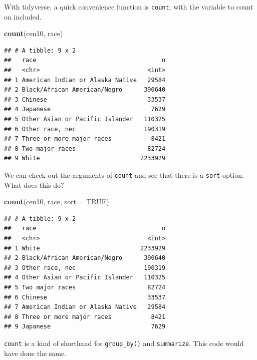 \documentclass[]{book}
\newenvironment{Shaded}{\begin{snugshade}}{\end{snugshade}}
\newcommand{\DataTypeTok}[1]{\textcolor[rgb]{0.13,0.29,0.53}{#1}}
\newcommand{\KeywordTok}[1]{\textcolor[rgb]{0.13,0.29,0.53}{\textbf{#1}}}
\newcommand{\NormalTok}[1]{#1}
\newcommand{\OperatorTok}[1]{\textcolor[rgb]{0.81,0.36,0.00}{\textbf{#1}}}
\newcommand{\OtherTok}[1]{\textcolor[rgb]{0.56,0.35,0.01}{#1}}
\newcommand{\StringTok}[1]{\textcolor[rgb]{0.31,0.60,0.02}{#1}}
\theoremstyle{definition}
\theoremstyle{definition}
\theoremstyle{definition}
\theoremstyle{remark}
\begin{document}
With tidyverse, a quick convenience function is \texttt{count}, with the variable to count on included.

\begin{Shaded}
\begin{Highlighting}[]
\KeywordTok{count}\NormalTok{(cen10, race)}
\end{Highlighting}
\end{Shaded}

\begin{verbatim}
## # A tibble: 9 x 2
##   race                                   n
##   <chr>                              <int>
## 1 American Indian or Alaska Native   29584
## 2 Black/African American/Negro      390640
## 3 Chinese                            33537
## 4 Japanese                            7629
## 5 Other Asian or Pacific Islander   110325
## 6 Other race, nec                   190319
## 7 Three or more major races           8421
## 8 Two major races                    82724
## 9 White                            2233929
\end{verbatim}

We can check out the arguments of \texttt{count} and see that there is a \texttt{sort} option. What does this do?

\begin{Shaded}
\begin{Highlighting}[]
\KeywordTok{count}\NormalTok{(cen10, race, }\DataTypeTok{sort =} \OtherTok{TRUE}\NormalTok{)}
\end{Highlighting}
\end{Shaded}

\begin{verbatim}
## # A tibble: 9 x 2
##   race                                   n
##   <chr>                              <int>
## 1 White                            2233929
## 2 Black/African American/Negro      390640
## 3 Other race, nec                   190319
## 4 Other Asian or Pacific Islander   110325
## 5 Two major races                    82724
## 6 Chinese                            33537
## 7 American Indian or Alaska Native   29584
## 8 Three or more major races           8421
## 9 Japanese                            7629
\end{verbatim}

\texttt{count} is a kind of shorthand for \texttt{group\_by()} and \texttt{summarize}. This code would have done the same.

\begin{Shaded}
\end{Shaded}
\end{document}
